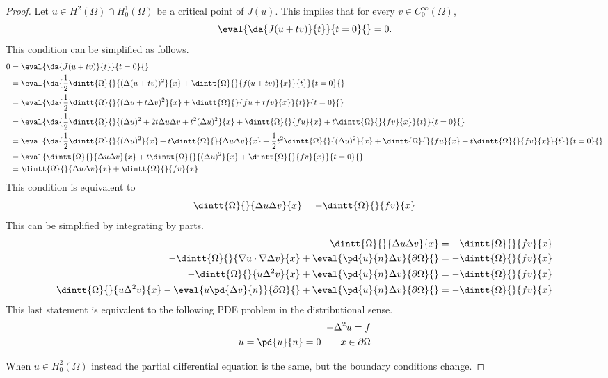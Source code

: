 \documentclass[11pt, oneside]{article}
\begin{document}
\begin{enumerate}
    \begin{proof}
      Let $u \in H^2(\Omega) \cap H^1_0(\Omega)$ be a critical point of $J(u)$.
      This implies that for every $v \in C^{\infty}_0(\Omega)$,
      \[
        \eval{\da{J(u + tv)}{t}}{t=0}{} = 0.
      \]
      This condition can be simplified as follows.
      \begin{align*}
        0 &= \eval{\da{J(u + tv)}{t}}{t=0}{} \\
        &= \eval{\da{\frac{1}{2} \dintt{\Omega}{}{(\Delta (u + tv))^2}{x} + \dintt{\Omega}{}{f(u + tv)}{x}}{t}}{t=0}{} \\
        &= \eval{\da{\frac{1}{2} \dintt{\Omega}{}{(\Delta u + t \Delta v)^2}{x} + \dintt{\Omega}{}{fu + t fv}{x}}{t}}{t=0}{} \\
        &= \eval{\da{\frac{1}{2} \dintt{\Omega}{}{(\Delta u)^2 + 2t \Delta u \Delta v + t^2(\Delta u)^2}{x} + \dintt{\Omega}{}{fu}{x} + t \dintt{\Omega}{}{fv}{x}}{t}}{t=0}{} \\
        &= \eval{\da{\frac{1}{2} \dintt{\Omega}{}{(\Delta u)^2}{x} + t \dintt{\Omega}{}{\Delta u \Delta v}{x} + \frac{1}{2}t^2 \dintt{\Omega}{}{(\Delta u)^2}{x} + \dintt{\Omega}{}{fu}{x} + t \dintt{\Omega}{}{fv}{x}}{t}}{t=0}{} \\
        &= \eval{\dintt{\Omega}{}{\Delta u \Delta v}{x} + t\dintt{\Omega}{}{(\Delta u)^2}{x} + \dintt{\Omega}{}{fv}{x}}{t=0}{} \\
        &= \dintt{\Omega}{}{\Delta u \Delta v}{x} + \dintt{\Omega}{}{fv}{x} \\
      \end{align*}
      This condition is equivalent to
      \[
        \dintt{\Omega}{}{\Delta u \Delta v}{x} = - \dintt{\Omega}{}{fv}{x}
      \]
      This can be simplified by integrating by parts.
      \begin{align*}
        \dintt{\Omega}{}{\Delta u \Delta v}{x} &= -\dintt{\Omega}{}{fv}{x} \\
        -\dintt{\Omega}{}{\nabla u \cdot \nabla \Delta v}{x} + \eval{\pd{u}{n} \Delta v}{\partial \Omega}{} &= -\dintt{\Omega}{}{fv}{x} \\
        -\dintt{\Omega}{}{u \Delta^2 v}{x} + \eval{\pd{u}{n} \Delta v}{\partial \Omega}{} &= -\dintt{\Omega}{}{fv}{x} \\
        \dintt{\Omega}{}{u \Delta^2 v}{x} - \eval{u \pd{\Delta v}{n}}{\partial \Omega}{} + \eval{\pd{u}{n} \Delta v}{\partial \Omega}{} &= -\dintt{\Omega}{}{fv}{x} \\
      \end{align*}
      This last statement is equivalent to the following PDE problem in the
      distributional sense.
      \begin{align*}
        -\Delta^2 u = f \\
        u = \pd{u}{n} = 0 \qquad x \in \partial \Omega
      \end{align*}

      When $u \in H^2_0(\Omega)$ instead the partial differential equation is
      the same, but the boundary conditions change.
    \end{proof}
\end{enumerate}
\end{document}
